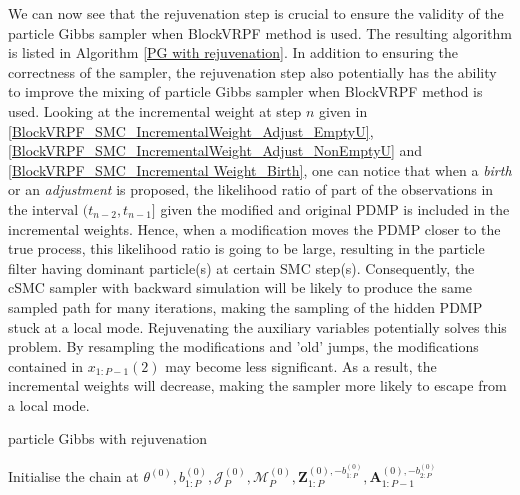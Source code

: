 \documentclass[12pt,a4paper]{article}
\begin{document}
We can now see that the rejuvenation step is crucial to ensure the validity of the particle Gibbs sampler when BlockVRPF method is used. The resulting algorithm is listed in Algorithm \ref{PG with rejuvenation}. In addition to ensuring the correctness of the sampler, the rejuvenation step also potentially has the ability to improve the mixing of particle Gibbs sampler when BlockVRPF method is used. Looking at the incremental weight at step \(n\) given in \eqref{BlockVRPF_SMC_IncrementalWeight_Adjust_EmptyU}, \eqref{BlockVRPF_SMC_IncrementalWeight_Adjust_NonEmptyU} and \eqref{BlockVRPF_SMC_Incremental Weight_Birth}, one can notice that when a \textit{birth} or an \textit{adjustment} is proposed, the likelihood ratio of part of the observations in the interval \((t_{n-2},t_{n-1}]\) given the modified and original PDMP is included in the incremental weights. Hence, when a modification moves the PDMP closer to the true process, this likelihood ratio is going to be large, resulting in the particle filter having dominant particle(s) at certain SMC step(s). Consequently, the cSMC sampler with backward simulation will be likely to produce the same sampled path for many iterations, making the sampling of the hidden PDMP stuck at a local mode. Rejuvenating the auxiliary variables potentially solves this problem. By resampling the modifications and 'old' jumps, the modifications contained in \(x_{1:P-1}(2)\) may become less significant. As a result, the incremental weights will decrease, making the sampler more likely to escape from a local mode. 

\begin{algorithm}
    \caption{particle Gibbs with rejuvenation}\label{PG with rejuvenation}
    Initialise the chain at \(\theta^{(0)},b_{1:P}^{(0)},\mathcal{J}_P^{(0)},\mathcal{M}_P^{(0)},\mathbf{Z}_{1:P}^{(0),-b_{1:P}^{(0)}},\mathbf{A}_{1:P-1}^{(0),-b_{2:P}^{(0)}}\)\;
\end{algorithm}
\end{document}
